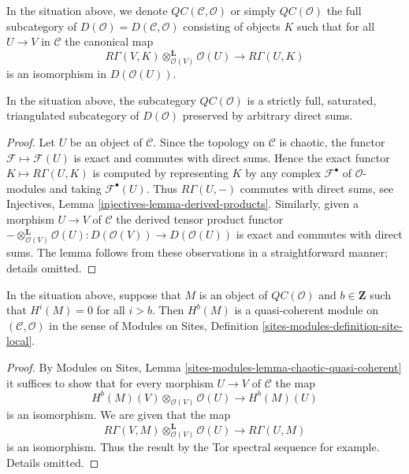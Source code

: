 \begin{definition}
\label{definition-cartesian}
In the situation above, we denote $\mathit{QC}(\mathcal{C}, \mathcal{O})$
or simply {\it $\mathit{QC}(\mathcal{O})$}
the full subcategory of $D(\mathcal{O}) = D(\mathcal{C}, \mathcal{O})$
consisting of objects $K$ such that
for all $U \to V$ in $\mathcal{C}$ the canonical map
$$
R\Gamma(V, K) \otimes_{\mathcal{O}(V)}^\mathbf{L} \mathcal{O}(U)
\longrightarrow
R\Gamma(U, K)
$$
is an isomorphism in $D(\mathcal{O}(U))$.
\end{definition}

\begin{lemma}
\label{lemma-cartesian-good-sub}
In the situation above, the subcategory $\mathit{QC}(\mathcal{O})$ is a
strictly full, saturated, triangulated subcategory of $D(\mathcal{O})$
preserved by arbitrary direct sums.
\end{lemma}

\begin{proof}
Let $U$ be an object of $\mathcal{C}$. Since the topology
on $\mathcal{C}$ is chaotic, the functor $\mathcal{F} \mapsto \mathcal{F}(U)$
is exact and commutes with direct sums. Hence the exact functor
$K \mapsto R\Gamma(U, K)$ is computed by representing $K$ by any complex
$\mathcal{F}^\bullet$ of $\mathcal{O}$-modules and taking
$\mathcal{F}^\bullet(U)$. Thus $R\Gamma(U, -)$ commutes with direct
sums, see Injectives, Lemma \ref{injectives-lemma-derived-products}.
Similarly, given a morphism $U \to V$ of $\mathcal{C}$
the derived tensor product functor
$- \otimes_{\mathcal{O}(V)}^\mathbf{L} \mathcal{O}(U) :
D(\mathcal{O}(V)) \to D(\mathcal{O}(U))$
is exact and commutes with direct sums. The lemma follows
from these observations in a straightforward manner; details omitted.
\end{proof}

\begin{lemma}
\label{lemma-QC-bounded-above}
In the situation above, suppose that $M$ is an object of
$\mathit{QC}(\mathcal{O})$ and $b \in \mathbf{Z}$ such that $H^i(M) = 0$
for all $i > b$. Then $H^b(M)$ is a quasi-coherent module on
$(\mathcal{C}, \mathcal{O})$ in the sense of
Modules on Sites, Definition \ref{sites-modules-definition-site-local}.
\end{lemma}

\begin{proof}
By Modules on Sites, Lemma \ref{sites-modules-lemma-chaotic-quasi-coherent}
it suffices to show that for every morphism $U \to V$ of
$\mathcal{C}$ the map
$$
H^b(M)(V) \otimes_{\mathcal{O}(V)} \mathcal{O}(U) \to H^b(M)(U)
$$
is an isomorphism. We are given that the map
$$
R\Gamma(V, M) \otimes_{\mathcal{O}(V)}^\mathbf{L} \mathcal{O}(U)
\to R\Gamma(U, M)
$$
is an isomorphism. Thus the result by the Tor spectral sequence for example.
Details omitted.
\end{proof}

